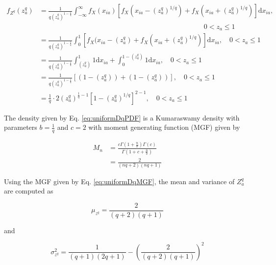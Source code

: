 \documentclass[10pt,letterpaper]{article}\usepackage[]{graphicx}\usepackage[]{color}
\begin{document}
\begin{equation}\label{eq:uniformDqPDF}
\begin{aligned}
f_{Z^q}(z^q_a) &= \frac{1}{q\left(z^q_a\right)^{1 - \frac{1}{q}}}\int_{-\infty}^{\infty}f_X(x_{ia})\left[f_X\left(x_{ia} - \left(z^q_a\right)^{1/q}\right) + f_X\left(x_{ia} + \left(z^q_a\right)^{1/q}\right)\right]\text{d}x_{ia},\\
& \hspace{4in} 0 < z_a \leq 1\\
&= \frac{1}{q\left(z^q_a\right)^{1 - \frac{1}{q}}}\int_{0}^{1}[f_X(x_{ia} - \left(z^q_a\right) + f_X\left(x_{ia} + \left(z^q_a\right)^{1/q}\right)]\text{d}x_{ia}, \quad 0 < z_a \leq 1 \\
&= \frac{1}{q\left(z^q_a\right)^{1 - \frac{1}{q}}}\int_{\left(z^q_a\right)}^{1}1\text{d}x_{ia} + \int_{0}^{1 - \left(z^q_a\right)}1\text{d}x_{ia}, \quad 0 < z_a \leq 1 \\
&= \frac{1}{q\left(z^q_a\right)^{1 - \frac{1}{q}}}\left[\left(1 - \left(z^q_a\right)\right) + \left(1 - \left(z^q_a\right)\right)\right], \quad 0 < z_a \leq 1 \\
&= \frac{1}{q} \cdot 2 \left(z^q_a\right)^{\frac{1}{q} - 1}\left[1 - \left(z^q_a\right)^{1/q}\right]^{2 - 1}, \quad 0 < z_a \leq 1
\end{aligned}
\end{equation}

The density given by Eq. \ref{eq:uniformDqPDF} is a Kumaraswamy density with parameters $b = \frac{1}{q}$ and $c = 2$ with moment generating function (MGF) given by

\begin{equation}\label{eq:uniformDqMGF}
\begin{aligned}
M_n &=  \frac{c\Gamma\left(1 + \frac{n}{b}\right) \Gamma(c)}{\Gamma\left(1 + c + \frac{n}{b}\right)}\\
&= \frac{2}{(nq + 2)(nq + 1)}
\end{aligned}
\end{equation}

Using the MGF given by Eq. \ref{eq:uniformDqMGF}, the mean and variance of $Z^q_a$ are computed as

\begin{equation}\label{eq:1DuniformDqMean}
\mu_{z^q} = \frac{2}{(q + 2)(q + 1)}
\end{equation}

\noindent and

\begin{equation}\label{eq:1DuniformDqVar}
\sigma^2_{z^q} = \frac{1}{(q + 1)(2q + 1)} - \left(\frac{2}{(q + 2)(q + 1)}\right)^2
\end{equation}
\end{document}
